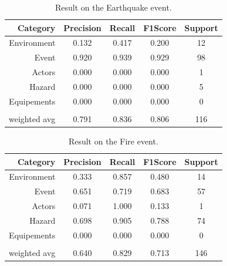 \begin{table}[htbp]
    \centering
    \caption{Result on the Earthquake event.}
    \begin{tabular}{rcccc}
        Category     & Precision & \textbf{Recall} & F1\-Score & Support \\
        \toprule
        Environment  & 0.132     & 0.417           & 0.200     & 12      \\
        Event        & 0.920     & 0.939           & 0.929     & 98      \\
        Actors       & 0.000     & 0.000           & 0.000     & 1       \\
        Hazard       & 0.000     & 0.000           & 0.000     & 5       \\
        Equipements  & 0.000     & 0.000           & 0.000     & 0       \\
                     &           &                 &           &         \\
        weighted avg & 0.791     & 0.836           & 0.806     & 116     \\
        \bottomrule
    \end{tabular}
    \label{table:earthquake-results}
\end{table}

\begin{table}[htbp]
    \centering
    \caption{Result on the Fire event.}
    \begin{tabular}{rcccc}
        Category     & Precision & \textbf{Recall} & F1\-Score & Support \\
        \toprule
        Environment  & 0.333     & 0.857           & 0.480     & 14      \\
        Event        & 0.651     & 0.719           & 0.683     & 57      \\
        Actors       & 0.071     & 1.000           & 0.133     & 1       \\
        Hazard       & 0.698     & 0.905           & 0.788     & 74      \\
        Equipements  & 0.000     & 0.000           & 0.000     & 0       \\
                     &           &                 &           &         \\
        weighted avg & 0.640     & 0.829           & 0.713     & 146     \\
        \bottomrule
    \end{tabular}
    \label{table:fire-results}
\end{table}

